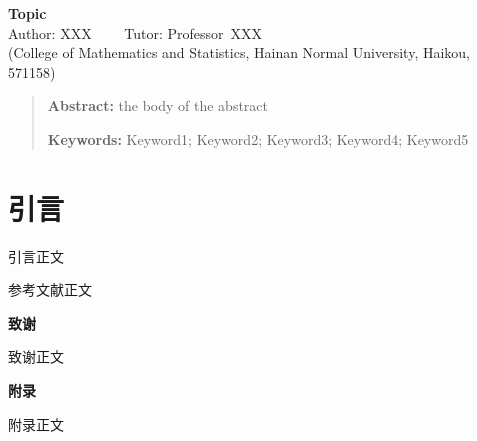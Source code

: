 \documentclass[11pt,a4paper]{article}
\begin{document}
\begin{center}
		\Large{\textbf {Topic} }%
		\\
		\large{ Author: XXX ~~~~Tutor: Professor~XXX  %
			\\
			(College of Mathematics and Statistics, Hainan Normal University, Haikou, 571158)}
\end{center}
\renewcommand\baselinestretch{1.4}\selectfont
\begin{quotation} \textbf{Abstract:}
		the body of the abstract
		
	\textbf{Keywords:} Keyword1; Keyword2; Keyword3; Keyword4; Keyword5
\end{quotation}\par

\newpage
{}
\section{引言}

引言正文


\renewcommand\baselinestretch{1.1}\selectfont
\renewcommand\refname{\textbf{参考文献}}
\begin{thebibliography}{99}
	\fangsong
	
	参考文献正文
	
\end{thebibliography}


\renewcommand\baselinestretch{1.4}\selectfont
{}
\begin{flushleft}
	\textbf{致谢}
\end{flushleft}

致谢正文


\begin{flushleft}
	\textbf{附录}
\end{flushleft}

附录正文
\end{document}

